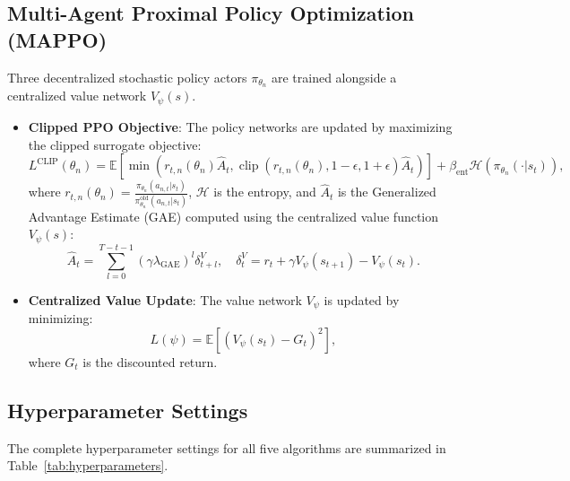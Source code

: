 \documentclass[journal,onecolumn]{IEEEtran}
\begin{document}
\subsection{Multi-Agent Proximal Policy Optimization (MAPPO)}
Three decentralized stochastic policy actors $\pi_{\theta_n}$ are trained alongside a centralized value network $V_\psi(s)$.
\begin{itemize}
    \item \textbf{Clipped PPO Objective}: The policy networks are updated by maximizing the clipped surrogate objective:
    \begin{equation}
        L^{\text{CLIP}}(\theta_n) = \mathbb{E}\left[ \min\left( r_{t,n}(\theta_n) \widehat{A}_t, \operatorname{clip}\left( r_{t,n}(\theta_n), 1-\epsilon, 1+\epsilon \right) \widehat{A}_t \right) \right] + \beta_{\text{ent}} \mathcal{H}\left( \pi_{\theta_n}(\cdot|s_t) \right),
    \end{equation}
    where $r_{t,n}(\theta_n) = \frac{\pi_{\theta_n}(a_{n,t}|s_t)}{\pi_{\theta_n}^{\text{old}}(a_{n,t}|s_t)}$, $\mathcal{H}$ is the entropy, and $\widehat{A}_t$ is the Generalized Advantage Estimate (GAE) computed using the centralized value function $V_\psi(s)$:
    \begin{equation}
        \widehat{A}_t = \sum_{l=0}^{T-t-1} (\gamma \lambda_{\text{GAE}})^l \delta_{t+l}^V, \quad \delta_t^V = r_t + \gamma V_\psi(s_{t+1}) - V_\psi(s_t).
    \end{equation}
    \item \textbf{Centralized Value Update}: The value network $V_\psi$ is updated by minimizing:
    \begin{equation}
        L(\psi) = \mathbb{E}\left[ \left( V_\psi(s_t) - G_t \right)^2 \right],
    \end{equation}
    where $G_t$ is the discounted return.
\end{itemize}

\subsection{Hyperparameter Settings}
The complete hyperparameter settings for all five algorithms are summarized in Table~\ref{tab:hyperparameters}.
\end{document}

